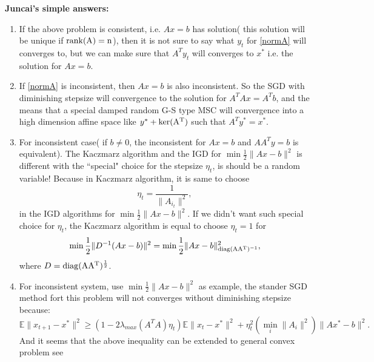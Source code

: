 {\bf{Juncai's simple answers}:}
\begin{enumerate}
	\item If the above problem is consistent, i.e. $Ax = b$ has solution( this solution will be unique if $\rm{rank}(A) = n$), then it is not sure to say what $y_t$ for \eqref{normA} will converges to, but we can make sure that $A^T y_t$ will converges to $x^*$ i.e. the solution for $Ax = b$.
	
	\item If \eqref{normA} is inconsistent, then $Ax = b$ is also inconsistent. So the SGD with diminishing stepsize will convergence to the solution for $A^TA x = A^Tb$, and the means that a special damped random G-S type MSC will convergence into a high dimension affine space like $y^* + \rm{ker}(A^T)$ such that $A^T y^* = x^*$.
	
	\item For inconsistent case( if $b \neq 0$, the inconsistent for $Ax=b$ and $AA^Ty = b$ is equivalent). The Kaczmarz algorithm and the IGD for $\min \frac{1}{2}\|Ax - b\|^2$ is different with the ``special" choice for the stepsize $\eta_t$, is should be a random variable! Because in Kaczmarz algorithm, it is same to choose 
	\begin{equation}
	\eta_t = \frac{1}{\|A_{i_t}\|^2},
	\end{equation}
	in the IGD algorithms for  $\min \frac{1}{2}\|Ax - b\|^2$. If we didn't want such special choice for $\eta_t$, the Kaczmarz algorithm is equal to choose $\eta_t = 1$ for 
	\begin{equation}
	\min \frac{1}{2}\|D^{-1}(Ax - b)\|^2 = \min \frac{1}{2} \|Ax-b\|^2_{\rm{diag}(AA^T)^{-1}},
	\end{equation}
	where $D = \rm{diag}(AA^T)^{\frac{1}{2}}$.
	
	\item For inconsistent system, use $\min \frac{1}{2}\|Ax - b\|^2$ as example, the stander SGD method fort this problem will not converges without diminishing stepsize because:
	\begin{equation}
	\mathbb{E}\|x_{t+1} - x^*\|^2 \ge (1 - 2 \lambda_{max}(A^TA) \eta_t) \mathbb{E}\|x_t - x^*\|^2 + \eta_t^2 (\min_i \|A_i\|^2)\|Ax^* - b\|^2.
	\end{equation}
	And it seems that the above inequality can be extended to general convex problem see 
	

\end{enumerate}
